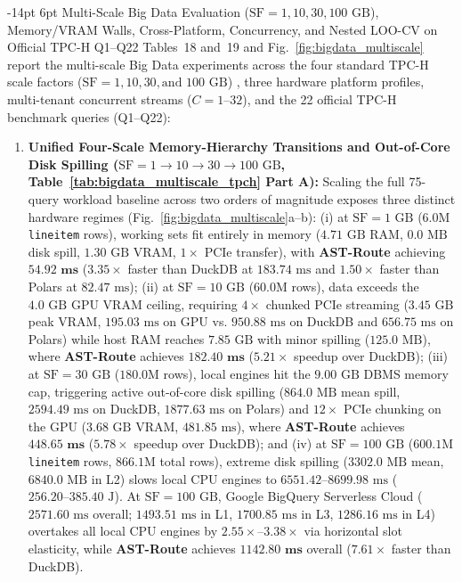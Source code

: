 \documentclass[10pt,a4paper]{article}
\makeatletter
\renewcommand\subsection{\@startsection{subsection}{2}{\z@}%
  {-14pt \@plus -3pt \@minus -1.5pt}%
  {6pt \@plus 1.5pt}%
  {\normalfont\normalsize\bfseries}}
\makeatother
\begin{document}
\subsection{Multi-Scale Big Data Evaluation ($\text{SF}=1, 10, 30, 100\text{ GB}$), Memory/VRAM Walls, Cross-Platform, Concurrency, and Nested LOO-CV on Official TPC-H Q1--Q22}
Tables~18 and~19 and Fig.~\ref{fig:bigdata_multiscale} report the multi-scale Big Data experiments across the four standard TPC-H scale factors ($\text{SF}=1, 10, 30, \text{and } 100\text{ GB}$) \cite{tpc2022tpch, dreseler2020quantifying}, three hardware platform profiles, multi-tenant concurrent streams ($C=1\text{--}32$), and the 22 official TPC-H benchmark queries (Q1--Q22):
\begin{enumerate}[leftmargin=1.5em,itemsep=2pt]
    \item \textbf{Unified Four-Scale Memory-Hierarchy Transitions and Out-of-Core Disk Spilling ($\text{SF}=1 \rightarrow 10 \rightarrow 30 \rightarrow 100\text{ GB}$, Table~\ref{tab:bigdata_multiscale_tpch} Part A):} Scaling the full 75-query workload baseline across two orders of magnitude exposes three distinct hardware regimes (Fig.~\ref{fig:bigdata_multiscale}a--b): (i) at $\text{SF}=1\text{ GB}$ ($6.0\text{M}$ \texttt{lineitem} rows), working sets fit entirely in memory ($4.71\text{ GB}$ RAM, $0.0\text{ MB}$ disk spill, $1.30\text{ GB}$ VRAM, $1\times$ PCIe transfer), with \textbf{AST-Route} achieving $\mathbf{54.92\text{ ms}}$ ($3.35\times$ faster than DuckDB at $183.74\text{ ms}$ and $1.50\times$ faster than Polars at $82.47\text{ ms}$); (ii) at $\text{SF}=10\text{ GB}$ ($60.0\text{M}$ rows), data exceeds the $4.0\text{ GB}$ GPU VRAM ceiling, requiring $4\times$ chunked PCIe streaming ($3.45\text{ GB}$ peak VRAM, $195.03\text{ ms}$ on GPU vs. $950.88\text{ ms}$ on DuckDB and $656.75\text{ ms}$ on Polars) while host RAM reaches $7.85\text{ GB}$ with minor spilling ($125.0\text{ MB}$), where \textbf{AST-Route} achieves $\mathbf{182.40\text{ ms}}$ ($\mathbf{5.21\times}$ speedup over DuckDB); (iii) at $\text{SF}=30\text{ GB}$ ($180.0\text{M}$ rows), local engines hit the $9.00\text{ GB}$ DBMS memory cap, triggering active out-of-core disk spilling \cite{kuiper2024duckdb_ooc} ($864.0\text{ MB}$ mean spill, $2594.49\text{ ms}$ on DuckDB, $1877.63\text{ ms}$ on Polars) and $12\times$ PCIe chunking on the GPU ($3.68\text{ GB}$ VRAM, $481.85\text{ ms}$), where \textbf{AST-Route} achieves $\mathbf{448.65\text{ ms}}$ ($\mathbf{5.78\times}$ speedup over DuckDB); and (iv) at $\text{SF}=100\text{ GB}$ ($600.1\text{M}$ \texttt{lineitem} rows, $866.1\text{M}$ total rows), extreme disk spilling ($3302.0\text{ MB}$ mean, $6840.0\text{ MB}$ in L2) slows local CPU engines to $6551.42\text{--}8699.98\text{ ms}$ ($256.20\text{--}385.40\text{ J}$). At $\text{SF}=100\text{ GB}$, Google BigQuery Serverless Cloud ($2571.60\text{ ms}$ overall; $1493.51\text{ ms}$ in L1, $1700.85\text{ ms}$ in L3, $1286.16\text{ ms}$ in L4) overtakes all local CPU engines by $\mathbf{2.55\times\text{--}3.38\times}$ via horizontal slot elasticity, while \textbf{AST-Route} achieves $\mathbf{1142.80\text{ ms}}$ overall ($\mathbf{7.61\times}$ faster than DuckDB).

\end{enumerate}
\end{document}
